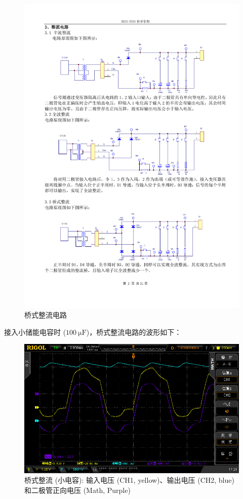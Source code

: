\documentclass[UTF8]{article}
\begin{document}
\begin{figure}[H]\centering
    \includegraphics[width=0.9\columnwidth]{LCE-01-二极管/assets/实验原理/电路图 copy 3.pdf}
    \caption{桥式整流电路}
    \label{fig: bridge rectifier circuit}
\end{figure}

接入小储能电容时 ($100 \ \mathrm{\mu F}$)，桥式整流电路的波形如下：

\begin{figure}[H]\centering
    \includegraphics[width=\columnwidth]{LCE-01-二极管/assets/二极管整流电路/桥式整流-接电容-电压波形.png}
    \caption{桥式整流 (小电容): 输入电压 (CH1, yellow)、输出电压 (CH2, blue) 和二极管正向电压 (Math, Purple)}
\end{figure}
\end{document}
